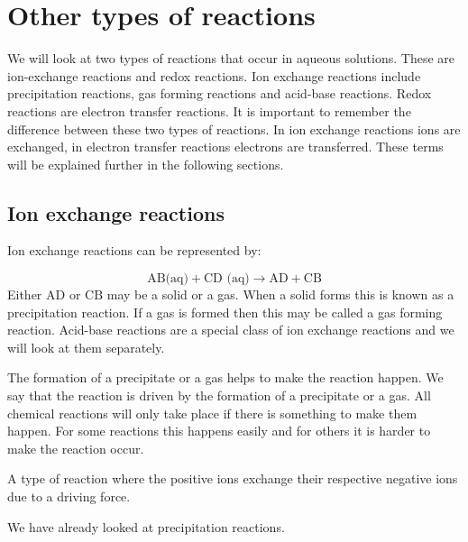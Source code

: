 {{         \section{Other types of reactions}
    \nopagebreak
            \label{m38719*uid2131}
	We will look at two types of reactions that occur in aqueous solutions. These are ion-exchange reactions and redox reactions. Ion exchange reactions include precipitation reactions, gas forming reactions and acid-base reactions. Redox reactions are electron transfer reactions. It is important to remember the difference between these two types of reactions. In ion exchange reactions ions are exchanged, in electron transfer reactions electrons are transferred. These terms will be explained further in the following sections. 
      \par 
\subsection*{Ion exchange reactions}
      \label{m38719*uid78332}
	Ion exchange reactions can be represented by:
	  \label{m38719*eid071534}\nopagebreak\noindent{}
	    
    \begin{equation*}
    \text{AB(aq)}+\text{CD (aq)}\to \text{AD}+\text{CB}
      \end{equation*}
	  Either $\text{AD}$ or $\text{CB}$ may be a solid or a gas. When a solid forms this is known as a precipitation reaction. If a gas is formed then this may be called a gas forming reaction. Acid-base reactions are a special class of ion exchange reactions and we will look at them separately. 
      \par 
      \label{m38719*eip-179}The formation of a precipitate or a gas helps to make the reaction happen. We say that the reaction is driven by the formation of a precipitate or a gas. All chemical reactions will only take place if there is something to make them happen. For some reactions this happens easily and for others it is harder to make the reaction occur.  \par 
\label{m38719*id7583}
  { \label{m38719*eip-id1168354893169}A type of reaction where the positive ions exchange their respective negative ions due to a driving force. } 
\label{m38719*uid10825}
	\par
We have already looked at precipitation reactions.
}}
